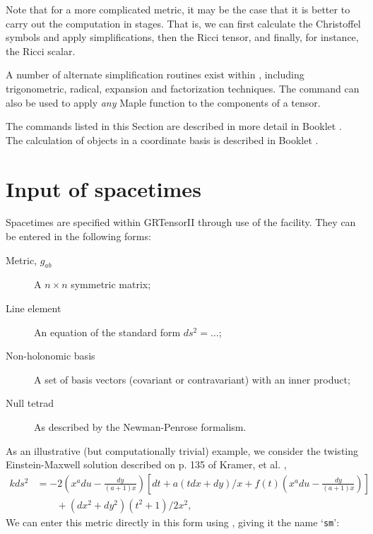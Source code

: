 \documentclass{article}
\begin{document}
{Note that for a more complicated metric, it may be the case that it is
better to carry out the computation in stages. That is, we can first
calculate the Christoffel symbols and apply simplifications, then the
Ricci tensor, and finally, for instance, the Ricci scalar.

A number of alternate simplification routines exist within
, including trigonometric, radical, expansion and
factorization techniques.  The command  can also be used
to apply \textit{any} Maple function to the components of a tensor.

The commands listed in this Section are described in more detail in
Booklet \grCalcRef. The calculation of objects in a coordinate basis
is described in Booklet \grBasisRef.
%
\section{Input of spacetimes}
Spacetimes are specified within GRTensorII through use of the
 facility. They can be entered in the following forms:
\begin{description}
  \item[Metric, $g_{ab}$] A $n\times n$ symmetric matrix;
  \item[Line element] An equation of the standard form $ds^2 = \ldots$;
  \item[Non-holonomic basis] A set of basis vectors (covariant or
    contravariant) with an inner product;
  \item[Null tetrad] As described by the Newman-Penrose formalism.
\end{description}
As an illustrative (but computationally trivial) example, we consider
the twisting Einstein-Maxwell solution described on p. 135 of Kramer,
et al.  \cite{krameretal},
\begin{align*}
  kds^2 & = -2\left( x^a du - \frac{dy}{(a+1)x}\right)
    \left[ dt + a(t dx + dy)/x + f(t)\left( x^a du - \frac{dy}{(a+1)x}
    \right)\right] \nonumber\\
    & \qquad + (dx^2 + dy^2)(t^2+1)/2x^2,
\end{align*}
We can enter this metric directly in this form using , giving
it the name `\texttt{sm}':\\

}
\end{document}
